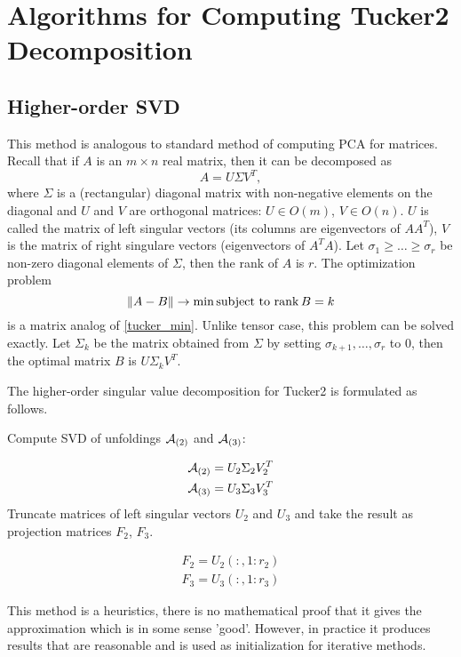 \chapter{Algorithms for Computing Tucker2 Decomposition}
\label{alg_chapter}



\section{Higher-order SVD}
This method is analogous to standard method of computing PCA for matrices.
Recall that if $A$ is an $m \times n$ real matrix, then it can be decomposed as 
\begin{equation}
 A = U \Sigma V^T,
\end{equation}
where $\Sigma$ is a (rectangular) diagonal matrix with non-negative elements on the diagonal and $U$ and $V$ are orthogonal matrices: $U \in O(m)$, 
$V \in O(n)$. $U$ is called the matrix of left singular vectors (its columns are eigenvectors of $AA^T$), $V$ is the
matrix of right singulare vectors (eigenvectors of $A^TA$). Let $ \sigma_1 \geq \dots \geq \sigma_r$ be non-zero diagonal elements of $\Sigma$, then the rank of $A$ is $r$. The optimization problem
\begin{equation}
\| A - B \| \to \min \mbox{subject to $\operatorname*{rank} B = k $}
\end{equation}
is a matrix analog of \eqref{tucker_min}. Unlike tensor case, this problem can be solved exactly.
Let $\Sigma_k$ be  the matrix obtained from $\Sigma$ by setting $\sigma_{k+1}, \dots, \sigma_r$
to $0$, then the optimal matrix $B$ is $U \Sigma_k V^T$. 

The higher-order singular value decomposition for Tucker2 is formulated as follows.

Compute SVD of unfoldings $\mathcal{A}_{(2)}$ and $\mathcal{A}_{(3)}$:

\begin{eqnarray}
 \mathcal{A}_{(2)} = U_2 \Sigma_2 V_2^T  \\
 \mathcal{A}_{(3)} = U_3 \Sigma_3 V_3^T
\end{eqnarray}
Truncate matrices of left singular vectors $U_2$ and $U_3$ and take the result
as projection matrices $F_2$, $F_3$.

\begin{eqnarray}
F_2 = U_2(:, 1:r_2) \\
F_3= U_3(:, 1:r_3)
\end{eqnarray}

This method is a heuristics, there is no mathematical proof that it gives
the approximation which is in some sense 'good'. However, in practice it produces
results that are reasonable and is used as initialization for iterative methods.








